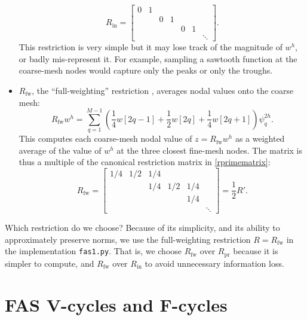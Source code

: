 \documentclass[letterpaper,final,12pt,reqno]{amsart}
\newcommand{\Rpr}{R_{\text{pr}}}
\newcommand{\Rin}{R_{\text{in}}}
\newcommand{\Rfw}{R_{\text{fw}}}
\begin{document}
\begin{itemize}
\begin{equation}
\Rin = \begin{bmatrix}
0 & 1 &   &   &   &   &\\
  &   & 0 & 1 &   &   & \\
  &   &   &   & 0 & 1 & \\
  &   &   &   &   &   & \ddots
\end{bmatrix}. \label{rinmatrix}
\end{equation}
This restriction is very simple but it may lose track of the magnitude of $w^h$, or badly mis-represent it.  For example, sampling a sawtooth function at the coarse-mesh nodes would capture only the peaks or only the troughs.
\item $\Rfw$, the ``full-weighting'' restriction \cite{Briggsetal2000}, averages nodal values onto the coarse mesh:
\begin{equation}
  \Rfw w^h = \sum_{q=1}^{M-1} \left(\frac{1}{4} w[2q-1] + \frac{1}{2} w[2q] + \frac{1}{4} w[2q+1]\right) \psi_q^{2h}. \label{rfwdefinition}
\end{equation}
This computes each coarse-mesh nodal value of $z=\Rfw w^h$ as a weighted average of the value of $w^h$ at the three closest fine-mesh nodes.  The matrix is thus a multiple of the canonical restriction matrix in \eqref{rprimematrix}:
\begin{equation}
\Rfw = \begin{bmatrix}
1/4 & 1/2 & 1/4 &     &     &  \\
    &     & 1/4 & 1/2 & 1/4 &  \\
    &     &     &     & 1/4 &  \\
    &     &     &     &     & \ddots
\end{bmatrix} = \frac{1}{2} R'. \label{rfwmatrix}
\end{equation}
\end{itemize}

\medskip
Which restriction do we choose?  Because of its simplicity, and its ability to approximately preserve norms, we use the full-weighting restriction $R=\Rfw$ in the implementation \texttt{fas1.py}.  That is, we choose $\Rfw$ over $\Rpr$ because it is simpler to compute, and $\Rfw$ over $\Rin$ to avoid unnecessary information loss.


\section{FAS V-cycles and F-cycles} \label{sec:fascycles}
\end{document}
